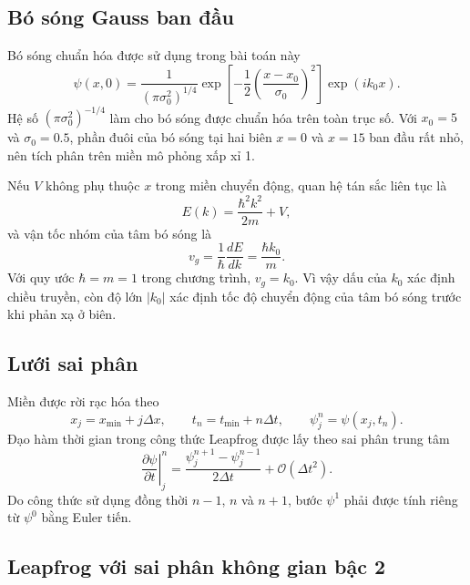 \documentclass[12pt,a4paper]{article}
\begin{document}
\subsection{Bó sóng Gauss ban đầu}

Bó sóng chuẩn hóa được sử dụng trong bài toán này
\begin{equation}
    \psi(x,0)=\frac{1}{(\pi\sigma_0^2)^{1/4}}
    \exp\left[-\frac{1}{2}\left(\frac{x-x_0}{\sigma_0}\right)^2\right]
    \exp(ik_0x).
    \label{eq:gaussian}
\end{equation}
Hệ số $(\pi\sigma_0^2)^{-1/4}$ làm cho bó sóng được chuẩn hóa trên toàn trục số. Với $x_0=5$ và $\sigma_0=0.5$, phần đuôi của bó sóng tại hai biên $x=0$ và $x=15$ ban đầu rất nhỏ, nên tích phân trên miền mô phỏng xấp xỉ 1.

Nếu $V$ không phụ thuộc $x$ trong miền chuyển động, quan hệ tán sắc liên tục là
\begin{equation}
    E(k)=\frac{\hbar^2k^2}{2m}+V,
\end{equation}
và vận tốc nhóm của tâm bó sóng là
\begin{equation}
    v_g=\frac{1}{\hbar}\frac{dE}{dk}=\frac{\hbar k_0}{m}.
    \label{eq:vg}
\end{equation}
Với quy ước $\hbar=m=1$ trong chương trình, $v_g=k_0$. Vì vậy dấu của $k_0$ xác định chiều truyền, còn độ lớn $|k_0|$ xác định tốc độ chuyển động của tâm bó sóng trước khi phản xạ ở biên.

\subsection{Lưới sai phân}

Miền được rời rạc hóa theo
\begin{equation}
    x_j=x_{\min}+j\Delta x,\qquad
    t_n=t_{\min}+n\Delta t,\qquad
    \psi_j^n=\psi(x_j,t_n).
\end{equation}
Đạo hàm thời gian trong công thức Leapfrog được lấy theo sai phân trung tâm
\begin{equation}
    \left.\frac{\partial\psi}{\partial t}\right|_j^n
    =\frac{\psi_j^{n+1}-\psi_j^{n-1}}{2\Delta t}
    +\mathcal O(\Delta t^2).
    \label{eq:time_center}
\end{equation}
Do công thức sử dụng đồng thời $n-1$, $n$ và $n+1$, bước $\psi^1$ phải được tính riêng từ $\psi^0$ bằng Euler tiến.

\subsection{Leapfrog với sai phân không gian bậc 2}
\end{document}

